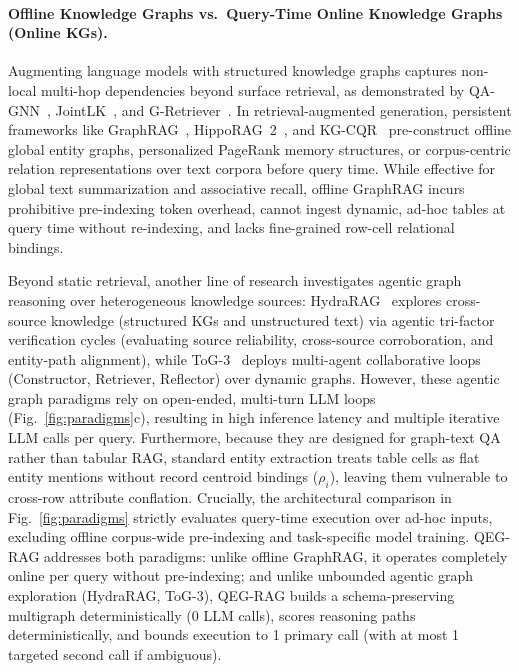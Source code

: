\documentclass[runningheads]{llncs}
\begin{document}
\paragraph{Offline Knowledge Graphs vs.\ Query-Time Online Knowledge Graphs (Online KGs).}
Augmenting language models with structured knowledge graphs captures non-local multi-hop dependencies beyond surface retrieval, as demonstrated by QA-GNN~\cite{yasunaga2021qagnn}, JointLK~\cite{sun2022jointlk}, and G-Retriever~\cite{he2024gretriever}. In retrieval-augmented generation, persistent frameworks like GraphRAG~\cite{edge2024graphrag}, HippoRAG~2~\cite{gutierrez2025hipporag2}, and KG-CQR~\cite{bui2025kgcqr} pre-construct offline global entity graphs, personalized PageRank memory structures, or corpus-centric relation representations over text corpora before query time. While effective for global text summarization and associative recall, offline GraphRAG incurs prohibitive pre-indexing token overhead, cannot ingest dynamic, ad-hoc tables at query time without re-indexing, and lacks fine-grained row-cell relational bindings.

Beyond static retrieval, another line of research investigates agentic graph reasoning over heterogeneous knowledge sources: HydraRAG~\cite{tan2025hydrarag} explores cross-source knowledge (structured KGs and unstructured text) via agentic tri-factor verification cycles (evaluating source reliability, cross-source corroboration, and entity-path alignment), while ToG-3~\cite{wu2025tog3} deploys multi-agent collaborative loops (Constructor, Retriever, Reflector) over dynamic graphs. However, these agentic graph paradigms rely on open-ended, multi-turn LLM loops (Fig.~\ref{fig:paradigms}c), resulting in high inference latency and multiple iterative LLM calls per query. Furthermore, because they are designed for graph-text QA rather than tabular RAG, standard entity extraction treats table cells as flat entity mentions without record centroid bindings ($\rho_i$), leaving them vulnerable to cross-row attribute conflation. Crucially, the architectural comparison in Fig.~\ref{fig:paradigms} strictly evaluates query-time execution over ad-hoc inputs, excluding offline corpus-wide pre-indexing and task-specific model training. QEG-RAG addresses both paradigms: unlike offline GraphRAG, it operates completely online per query without pre-indexing; and unlike unbounded agentic graph exploration (HydraRAG, ToG-3), QEG-RAG builds a schema-preserving multigraph deterministically (0 LLM calls), scores reasoning paths deterministically, and bounds execution to 1 primary call (with at most 1 targeted second call if ambiguous).
\end{document}
